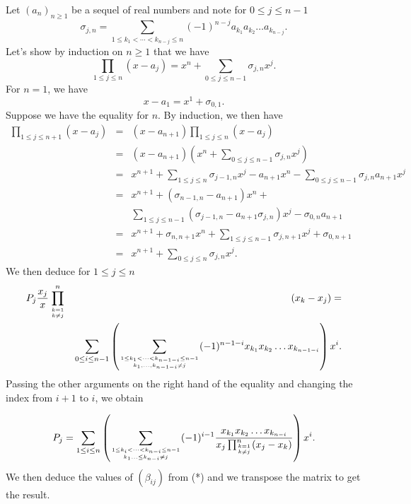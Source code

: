 \documentclass[a4paper,12pt]{article}
\begin{document}
Let $(a_n)_{n\ge 1}$ be a sequel of real numbers and note
for $0\le j\le n-1$
\[ \sigma_{j,n} =
\sum_{1\le k_1<\cdots<k_{n-j}\le n}(-1)^{n-j}
a_{k_1}a_{k_2}\ldots a_{k_{n-j}}.\]
Let's show by induction on $n\ge 1$ that we have
\[ \prod_{1\le j\le n}(x - a_j) = x^n +
\sum_{0\le j\le n-1} \sigma_{j,n}x^j.\]
For $n=1$, we have
\[ x-a_1 = x^1 + \sigma_{0,1}.\]
Suppose we have the equality for $n$.  By induction, we then have
\begin{eqnarray*}
  \prod_{1\le j\le n+1}(x-a_j) &=&
  (x-a_{n+1}) \prod_{1\le j\le n}(x-a_j) \\
  &=& (x-a_{n+1}) \left(x^n + \sum_{0\le j\le
    n-1}\sigma_{j,n}x^j\right) \\
  &=& x^{n+1} + \sum_{1\le j\le n}\sigma_{j-1,n}x^j -
  a_{n+1}x^n - \sum_{0\le j\le n-1}\sigma_{j,n}a_{n+1}x^j \\
  &=& x^{n+1} + (\sigma_{n-1,n} - a_{n+1})x^n + \\ &&
  \sum_{1\le j\le n-1}(\sigma_{j-1,n} - a_{n+1}\sigma_{j,n})x^j - 
  \sigma_{0,n}a_{n+1} \\
  &=& x^{n+1} + \sigma_{n,n+1}x^n +
  \sum_{1\le j\le n-1} \sigma_{j,n+1}x^j +
  \sigma_{0,n+1} \\
  &=& x^{n+1} + \sum_{0\le j\le n}\sigma_{j,n}x^j.
\end{eqnarray*}
We then deduce for $1\le j\le n$
\begin{eqnarray*}
  P_j\frac{x_j}{x} \prod_{k=1\atop k\not=j}^n&&(x_k - x_j) = \\
  &&
  \sum_{0\le i\le n-1}
  \left(
  \sum_{1\le k_1<\cdots<k_{n-1-i}\le n-1\atop k_1,\ldots,k_{n-1-i}\not= j}
  (-1)^{n-1-i}x_{k_1}x_{k_2}\ldots x_{k_{n-1-i}}\right)x^i.
\end{eqnarray*}
Passing the other arguments on the right hand of the equality and
changing the index from $i+1$ to $i$, we obtain

\[  P_j =
\sum_{1\le i\le n} \left(
\sum_{1\le k_i<\cdots<k_{n-i}\le n-1\atop k_1\ldots\le k_{n-i}\not= j}
(-1)^{i-1}
\frac{x_{k_1}x_{k_2}\ldots x_{k_{n-i}}}{x_j \prod_{k=1 \atop k\not=
    j}^n(x_j - x_k)}\right) x^i.\]
We then deduce the values of $(\beta_{ij})$ from (*) and we transpose
the matrix to get the result.
\end{document}
